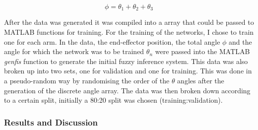 \documentclass[a4paper, oneside, 12pt]{article}
\begin{document}
\begin{equation}
	\phi = \theta_1 + \theta_2 + \theta_3
	\label{eqn::2}
\end{equation}

After the data was generated it was compiled into a array that could be passed to MATLAB functions for training. For the training of the networks, I chose to train one for each arm. In the data, the end-effector position, the total angle $\phi$ and the angle for which the network was to be trained $\theta_n$ were passed into the MATLAB \textit{genfis} function to generate the initial fuzzy inference system. This data was also broken up into two sets, one for validation and one for training. This was done in a pseudo-random way by randomising the order of the $\theta$ angles after the generation of the discrete angle array. The data was then broken down according to a certain split, initially a 80:20 split was chosen (training:validation).

\subsubsection{Results and Discussion}
\end{document}
